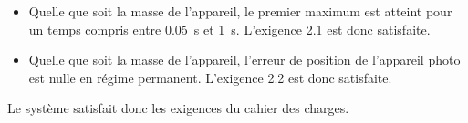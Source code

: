 \ifprof
\begin{corrige}
\begin{itemize}
\item Quelle que soit la masse de l'appareil, le premier maximum est atteint pour un temps compris entre \SI{0,05}{s} et \SI{1}{s}. L'exigence 2.1 est donc satisfaite. 
\item Quelle que soit la masse de l'appareil, l'erreur de position de l'appareil photo est nulle  en régime permanent. L'exigence 2.2 est donc satisfaite. 
\end{itemize}
Le système satisfait donc les exigences du cahier des charges. 

\end{corrige}
\else
\fi
